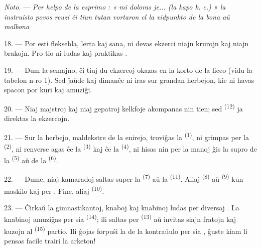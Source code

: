 \textit{Noto.} --- \textit{Per helpo de la esprimo : « mi doloras je... (la
kapo k. c.) » la instruisto povos reuzi ĉi tiun tutan vortaron el la
vidpunkto de la bona aŭ malbona} 

\VUsaut{5.0mm}
\VUsaut{2.4mm}
\VUsaut{3.0mm}

18. --- Por esti fleksebla, lerta kaj sana, ni devas ekzerci niajn krurojn kaj
niajn brakojn. Pro tio ni ludas kaj praktikas .

19. --- Dum la semajno, ĉi tiuj du ekzercoj okazas en la korto de la liceo
(vidu la tabelon n-ro 1). Sed ĵaŭde kaj dimanĉe ni iras sur grandan
herbejon, kie ni havas spacon por kuri kaj amuziĝi.

20. --- Niaj majstroj kaj niaj gepatroj kelkfoje akompanas nin tien; sed
 \textsuperscript{(12)} ja direktas la
ekzercojn.

21. --- Sur la herbejo, maldekstre de la enirejo, troviĝas la
 \textsuperscript{(1)}, ni grimpas per la
 \textsuperscript{(2)}, ni renverse agas ĉe la
 \textsuperscript{(3)} kaj ĉe la 
\textsuperscript{(4)}, ni hisas nin per la manoj ĝis la supro de la
 \textsuperscript{(5)} aŭ de la 
\textsuperscript{(6)}.

22. --- Dume, niaj kamaradoj saltas super la 
\textsuperscript{(7)} aŭ la  \textsuperscript{(11)}.
Aliaj  \textsuperscript{(8)} aŭ 
\textsuperscript{(9)} kun maskilo kaj per . Fine, aliaj
 \textsuperscript{(10)}.

\VUsaut{4.6mm}
\VUsaut{3.0mm}

23. --- Ĉirkaŭ la gimnastikantoj, knaboj kaj knabinoj ludas per diversaj
. La knabinoj amuziĝas per sia 
\textsuperscript{(14)}; ili saltas per  \textsuperscript{(13)}
aŭ invitas siajn fratojn kaj kuzojn al 
\textsuperscript{(15)} partio. Ili ĝojas forpuŝi la  de la
kontraŭulo per sia , ĝuste kiam li pensas facile
trairi la arketon!

